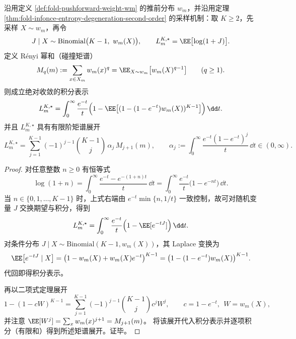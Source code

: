 \begin{theorem}\label{thm:fold-infonce-laplace-renyi-moment-expansion}
沿用定义 \ref{def:fold-pushforward-weight-wm} 的推前分布 \(w_m\)，并沿用定理 \ref{thm:fold-infonce-entropy-degeneration-second-order} 的采样机制：取 \(K\ge 2\)，先采样 \(X\sim w_m\)，再令
\[
J\mid X\sim \mathrm{Binomial}\bigl(K-1,\ w_m(X)\bigr),
\qquad
L_m^{K,\star}=\EE\bigl[\log(1+J)\bigr].
\]
定义 Rényi 幂和（碰撞矩谱）
\[
M_q(m):=\sum_{x\in X_m} w_m(x)^q=\EE_{X\sim w_m}\bigl[w_m(X)^{q-1}\bigr]\qquad(q\ge 1).
\]
则成立绝对收敛的积分表示
\[
L_m^{K,\star}
=
\int_{0}^{\infty}\frac{e^{-t}}{t}
\Bigl(1-\EE\bigl[(1-(1-e^{-t})w_m(X))^{K-1}\bigr]\Bigr)\,\dd t.
\]
并且 \(L_m^{K,\star}\) 具有有限阶矩谱展开
\[
L_m^{K,\star}
=
\sum_{j=1}^{K-1}(-1)^{j-1}\binom{K-1}{j}\,\alpha_j\,M_{j+1}(m),
\qquad
\alpha_j:=\int_{0}^{\infty}\frac{e^{-t}(1-e^{-t})^j}{t}\,\dd t\in(0,\infty).
\]
\end{theorem}
\begin{proof}
对任意整数 \(n\ge 0\) 有恒等式
\[
\log(1+n)=\int_{0}^{\infty}\frac{e^{-t}-e^{-(1+n)t}}{t}\,\dd t
=\int_{0}^{\infty}\frac{e^{-t}}{t}\bigl(1-e^{-nt}\bigr)\,\dd t.
\]
当 \(n\in\{0,1,\dots,K-1\}\) 时，上式右端由
\(
e^{-t}\min\{n,1/t\}
\)
一致控制，故可对随机变量 \(J\) 交换期望与积分，得到
\[
L_m^{K,\star}
=
\int_{0}^{\infty}\frac{e^{-t}}{t}\Bigl(1-\EE[e^{-tJ}]\Bigr)\,\dd t.
\]
对条件分布 \(J\mid X\sim\mathrm{Binomial}(K-1,w_m(X))\)，其 Laplace 变换为
\[
\EE\bigl[e^{-tJ}\mid X\bigr]
=\bigl(1-w_m(X)+w_m(X)e^{-t}\bigr)^{K-1}
=\bigl(1-(1-e^{-t})w_m(X)\bigr)^{K-1}.
\]
代回即得积分表示。
\par
再以二项式定理展开
\[
1-(1-cW)^{K-1}=\sum_{j=1}^{K-1}(-1)^{j-1}\binom{K-1}{j}c^j W^j,
\qquad c=1-e^{-t},\ \ W=w_m(X),
\]
并注意 \(\EE[W^j]=\sum_x w_m(x)^{j+1}=M_{j+1}(m)\)。
将该展开代入积分表示并逐项积分（有限和）得到所述矩谱展开。证毕。
\end{proof}

